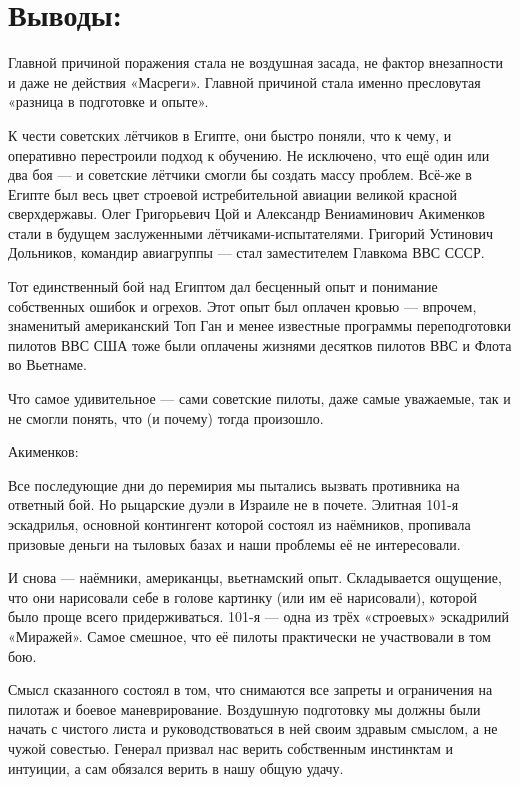 \section{Выводы:}

Главной причиной поражения стала не воздушная засада, не фактор внезапности и даже не действия «Масреги». Главной причиной стала именно пресловутая «разница в подготовке и опыте».

К чести советских лётчиков в Египте, они быстро поняли, что к чему, и оперативно перестроили подход к обучению. Не исключено, что ещё один или два боя — и советские лётчики смогли бы создать массу проблем. Всё-же в Египте был весь цвет строевой истребительной авиации великой красной сверхдержавы. Олег Григорьевич Цой и Александр Вениаминович Акименков стали в будущем заслуженными лётчиками-испытателями. Григорий Устинович Дольников, командир авиагруппы — стал заместителем Главкома ВВС СССР.

Тот единственный бой над Египтом дал бесценный опыт и понимание собственных ошибок и огрехов. Этот опыт был оплачен кровью — впрочем, знаменитый американский Топ Ган и менее известные программы переподготовки пилотов ВВС США тоже были оплачены жизнями десятков пилотов ВВС и Флота во Вьетнаме.

Что самое удивительное — сами советские пилоты, даже самые уважаемые, так и не смогли понять, что (и почему) тогда произошло.

Акименков:

\begin{textcitation}
	Все последующие дни до перемирия мы пытались вызвать противника на ответный бой. Но рыцарские дуэли в Израиле не в почете. Элитная 101-я эскадрилья, основной контингент которой состоял из наёмников, пропивала призовые деньги на тыловых базах и наши проблемы её не интересовали.
\end{textcitation}

И снова — наёмники, американцы, вьетнамский опыт. Складывается ощущение, что они нарисовали себе в голове картинку (или им её нарисовали), которой было проще всего придерживаться. 101-я — одна из трёх «строевых» эскадрилий «Миражей». Самое смешное, что её пилоты практически не участвовали в том бою.

\begin{textcitation}
	Смысл сказанного состоял в том, что снимаются все запреты и ограничения на пилотаж и боевое маневрирование. Воздушную подготовку мы должны были начать с чистого листа и руководствоваться в ней своим здравым смыслом, а не чужой совестью. Генерал призвал нас верить собственным инстинктам и интуиции, а сам обязался верить в нашу общую удачу.
\end{textcitation}

